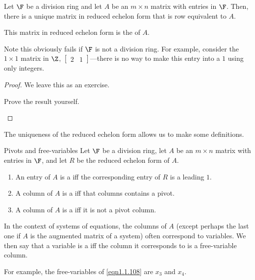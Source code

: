\begin{prp}{}{}
	Let $\F$ be a division ring and let $A$ be an $m\times n$ matrix with entries in $\F$.  Then, there is a unique matrix in reduced echelon form that is row equivalent to $A$.
	\begin{rmk}
		This matrix in reduced echelon form is the  of $A$.
	\end{rmk}
	\begin{rmk}
		Note this obviously fails if $\F$ is not a division ring.  For example, consider the $1\times 1$ matrix in $\Z$, $\begin{bmatrix}2 & 1\end{bmatrix}$---there is no way to make this entry into a $1$ using only integers.
	\end{rmk}
	\begin{proof}
		We leave this as an exercise.
		\begin{exr}[breakable=false]{}{}
			Prove the result yourself.
		\end{exr}
	\end{proof}
\end{prp}
The uniqueness of the reduced echelon form allows us to make some definitions.
\begin{dfn}{Pivots and free-variables}{}
	Let $\F$ be a division ring, let $A$ be an $m\times n$ matrix with entries in $\F$, and let $R$ be the reduced echelon form of $A$.
	\begin{enumerate}
		\item An entry of $A$ is a  iff the corresponding entry of $R$ is a leading $1$.
		\item A column of $A$ is a  iff that columns contains a pivot.
		\item A column of $A$ is a  iff it is not a pivot column.
	\end{enumerate}
	\begin{rmk}
		In the context of systems of equations, the columns of $A$ (except perhaps the last one if $A$ is the augmented matrix of a system) often correspond to variables.  We then say that a variable is a  iff the column it corresponds to is a free-variable column.
		
		For example, the free-variables of \eqref{eqn1.1.108} are $x_3$ and $x_4$.
	\end{rmk}
\end{dfn}
